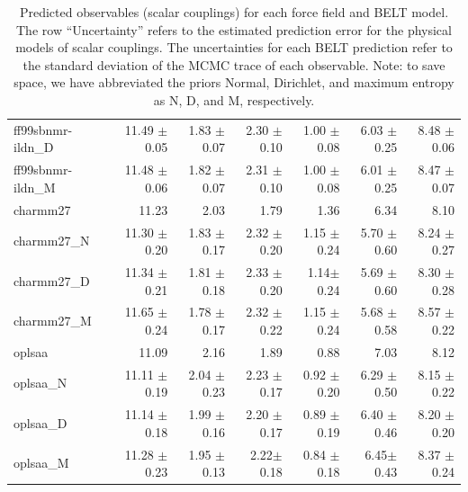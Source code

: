\documentclass[12pt]{article}
\begin{document}
\begin{table}
\begin{tabular}{lrrrrrr}
ff99sbnmr-ildn\_D &    11.49 $\pm$ 0.05 &          1.83 $\pm$ 0.07  &      2.30 $\pm$ 0.10  &          1.00  $\pm$ 0.08 &      6.03 $\pm$ 0.25 &     8.48 $\pm$ 0.06  \\
ff99sbnmr-ildn\_M    &    11.48 $\pm$ 0.06  &          1.82 $\pm$ 0.07  &      2.31  $\pm$ 0.10 &          1.00 $\pm$ 0.08 &      6.01  $\pm$ 0.25 &     8.47  $\pm$ 0.07 \\
\toprule
charmm27                    &    11.23 &          2.03 &      1.79 &          1.36 &      6.34 &     8.10 \\
charmm27\_N                &    11.30 $\pm$ 0.20 &          1.83 $\pm$ 0.17 &      2.32 $\pm$ 0.20 &          1.15 $\pm$ 0.24 &      5.70 $\pm$ 0.60 &     8.24 $\pm$ 0.27 \\
charmm27\_D          &    11.34 $\pm$ 0.21 &          1.81 $\pm$ 0.18 &      2.33  $\pm$ 0.20 &          1.14$\pm$ 0.24  &      5.69 $\pm$ 0.60 &     8.30 $\pm$ 0.28 \\
charmm27\_M             &    11.65 $\pm$ 0.24 &          1.78 $\pm$ 0.17  &      2.32 $\pm$ 0.22 &          1.15 $\pm$ 0.24  &      5.68 $\pm$ 0.58  &     8.57 $\pm$ 0.22  \\
\toprule
oplsaa                      &    11.09 &          2.16 &      1.89 &          0.88 &      7.03 &     8.12 \\
oplsaa\_N                  &    11.11 $\pm$ 0.19 &          2.04 $\pm$ 0.23 &      2.23 $\pm$ 0.17  &          0.92 $\pm$ 0.20  &      6.29  $\pm$ 0.50  &     8.15 $\pm$ 0.22 \\
oplsaa\_D            &    11.14 $\pm$ 0.18 &          1.99  $\pm$ 0.16 &      2.20  $\pm$ 0.17  &          0.89 $\pm$ 0.19 &      6.40 $\pm$ 0.46 &     8.20 $\pm$ 0.20 \\
oplsaa\_M               &    11.28 $\pm$ 0.23  &          1.95 $\pm$ 0.13 &      2.22$\pm$ 0.18  &          0.84  $\pm$ 0.18&      6.45$\pm$ 0.43 &     8.37 $\pm$ 0.24 \\
\bottomrule
\end{tabular}


\caption{
Predicted observables (scalar couplings) for each force field and BELT model.  The row ``Uncertainty'' refers to the estimated prediction error for the physical models of scalar couplings.  The uncertainties for each BELT prediction refer to the standard deviation of the MCMC trace of each observable.  Note: to save space, we have abbreviated the priors Normal, Dirichlet, and maximum entropy as N, D, and M, respectively.   
}
\end{table}
\end{document}
